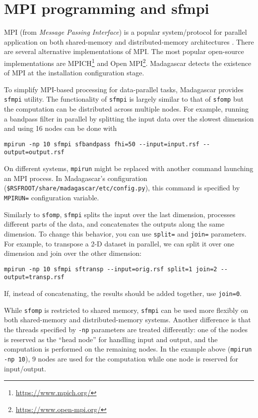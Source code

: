 \section{MPI programming and sfmpi}

MPI (from \emph{Message Passing Interface}) is a popular
system/protocol for parallel application on both shared-memory and
distributed-memory architectures \cite[]{pacheco,gropp}. There are several alternative
implementations of MPI. The most popular open-source implementations
are MPICH\footnote{\url{https://www.mpich.org/}} and Open
MPI\footnote{\url{https://www.open-mpi.org/}}. Madagascar detects the
existence of MPI at the installation configuration stage. 

To simplify MPI-based processing for data-parallel tasks, Madagascar
provides \texttt{sfmpi} utility. The functionality of \texttt{sfmpi}
is largely similar to that of \texttt{sfomp} but the computation can
be distributed across multiple nodes. For example, running a bandpass
filter in parallel by splitting the input data over the slowest
dimension and using 16 nodes can be done with
\begin{verbatim}
mpirun -np 10 sfmpi sfbandpass fhi=50 --input=input.rsf --output=output.rsf
\end{verbatim}
On different systems, \texttt{mpirun} might be replaced with another
command launching an MPI process. In Madagascar's configuration
(\texttt{\$RSFROOT/share/madagascar/etc/config.py}), this command is
specified by \texttt{MPIRUN=} configuration variable.

Similarly to \texttt{sfomp}, \texttt{sfmpi} splits the input over the last dimension,
processes different parts of the data, and concatenates the outputs
along the same dimension. To change this behavior, you can use
\texttt{split=} and \texttt{join=} parameters. For example, to
transpose a 2-D dataset in parallel, we can split it over one
dimension and join over the other dimension:
\begin{verbatim}
mpirun -np 10 sfmpi sftransp --input=orig.rsf split=1 join=2 --output=transp.rsf
\end{verbatim}
If, instead of concatenating, the results should be added together, use \texttt{join=0}.

While \texttt{sfomp} is restricted to shared memory, \texttt{sfmpi}
can be used more flexibly on both shared-memory and distributed-memory
systems. Another difference is that the threads specified by
\texttt{-np} parameters are treated differently: one of the nodes is
reserved as the ``head node'' for handling input and output, and the
computation is performed on the remaining nodes. In the example above
(\texttt{mpirun -np 10}), 9 nodes are used for the computation while
one node is reserved for input/output.

